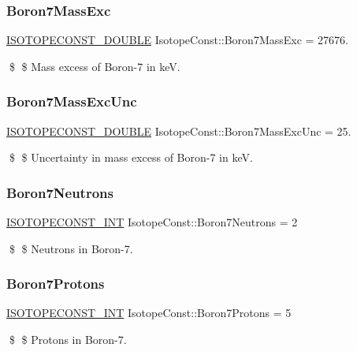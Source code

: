 \subsubsection{\texorpdfstring{Boron7\+Mass\+Exc}{Boron7MassExc}}
{\footnotesize\ttfamily \mbox{\hyperlink{group___isotope_const-_macros_ga8f45a7272ce02c0b4c65c44636ed719a}{I\+S\+O\+T\+O\+P\+E\+C\+O\+N\+S\+T\+\_\+\+D\+O\+U\+B\+LE}} Isotope\+Const\+::\+Boron7\+Mass\+Exc = 27676.}

\$ \$ Mass excess of Boron-\/7 in keV. \mbox{\label{group___isotope_const-_boron-_b7_ga5de66b4da638042e4e06b8a2b5ae8caa}} 
\subsubsection{\texorpdfstring{Boron7\+Mass\+Exc\+Unc}{Boron7MassExcUnc}}
{\footnotesize\ttfamily \mbox{\hyperlink{group___isotope_const-_macros_ga8f45a7272ce02c0b4c65c44636ed719a}{I\+S\+O\+T\+O\+P\+E\+C\+O\+N\+S\+T\+\_\+\+D\+O\+U\+B\+LE}} Isotope\+Const\+::\+Boron7\+Mass\+Exc\+Unc = 25.}

\$ \$ Uncertainty in mass excess of Boron-\/7 in keV. \mbox{\label{group___isotope_const-_boron-_b7_ga2215646f0b40a36f8341abbcf99a7317}} 
\subsubsection{\texorpdfstring{Boron7\+Neutrons}{Boron7Neutrons}}
{\footnotesize\ttfamily \mbox{\hyperlink{group___isotope_const-_macros_ga5f18360b3e99483a35c32d789e62621c}{I\+S\+O\+T\+O\+P\+E\+C\+O\+N\+S\+T\+\_\+\+I\+NT}} Isotope\+Const\+::\+Boron7\+Neutrons = 2}

\$ \$ Neutrons in Boron-\/7. \mbox{\label{group___isotope_const-_boron-_b7_gaa575238950a622be908d0b228178cabb}} 
\subsubsection{\texorpdfstring{Boron7\+Protons}{Boron7Protons}}
{\footnotesize\ttfamily \mbox{\hyperlink{group___isotope_const-_macros_ga5f18360b3e99483a35c32d789e62621c}{I\+S\+O\+T\+O\+P\+E\+C\+O\+N\+S\+T\+\_\+\+I\+NT}} Isotope\+Const\+::\+Boron7\+Protons = 5}

\$ \$ Protons in Boron-\/7. 